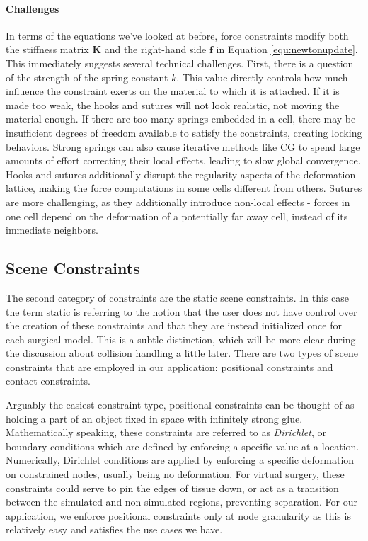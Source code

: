   \paragraph{Challenges} In terms of the equations we've looked at before, force constraints
  modify both the stiffness matrix $\bm K$ and the right-hand side
  $\mathbf f$ in Equation \ref{equ:newtonupdate}. This immediately
  suggests several technical challenges. First, there is a question of
  the strength of the spring constant $k$. This value directly
  controls how much influence the constraint exerts on the material to
  which it is attached. If it is made too weak, the hooks and sutures
  will not look realistic, not moving the material enough. If there
  are too many springs embedded in a cell, there may be insufficient
  degrees of freedom available to satisfy the constraints, creating
  locking behaviors. Strong springs can also cause iterative methods
  like CG to spend large amounts of effort correcting their local
  effects, leading to slow global convergence.  Hooks and sutures
  additionally disrupt the regularity aspects of the deformation
  lattice, making the force computations in some cells different from
  others. Sutures are more challenging, as they additionally introduce
  non-local effects - forces in one cell depend on the deformation of
  a potentially far away cell, instead of its immediate neighbors.
  
  \subsection{Scene Constraints}

  The second category of constraints are the static scene
  constraints. In this case the term static is referring to the notion that the
  user does not have control over the creation of these constraints
  and that they are instead initialized once for each surgical
  model. This is a subtle distinction, which will be more clear during
  the discussion about collision handling a little later. There are
  two types of scene constraints that are employed in our application:
  positional constraints and contact constraints. 

  Arguably the easiest constraint type, positional constraints can be
  thought of as holding a part of an object fixed in space with
  infinitely strong glue. Mathematically speaking, these constraints
  are referred to as \textit{Dirichlet}, or boundary conditions which
  are defined by enforcing a specific value at a
  location. Numerically, Dirichlet conditions are applied by enforcing
  a specific deformation on constrained nodes, usually being no
  deformation. For virtual surgery, these constraints could serve to
  pin the edges of tissue down, or act as a transition between the
  simulated and non-simulated regions, preventing separation. For our
  application, we enforce positional constraints only at node
  granularity as this is relatively easy and satisfies the use cases
  we have.

